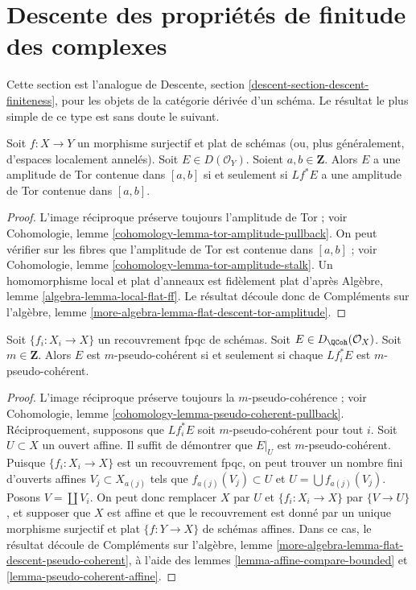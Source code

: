 \section{Descente des propriétés de finitude des complexes}
\label{section-descent-finiteness}

\noindent
Cette section est l'analogue de
Descente, section \ref{descent-section-descent-finiteness},
pour les objets de la catégorie dérivée d'un schéma.
Le résultat le plus simple de ce type est sans doute le suivant.

\begin{lemma}
\label{lemma-tor-amplitude-descends}
Soit $f : X \to Y$ un morphisme surjectif et plat de schémas
(ou, plus généralement, d'espaces localement annelés).
Soit $E \in D(\mathcal{O}_Y)$. Soient $a, b \in \mathbf{Z}$.
Alors $E$ a une amplitude de Tor contenue dans $[a, b]$ si et seulement si
$Lf^*E$ a une amplitude de Tor contenue dans $[a, b]$.
\end{lemma}

\begin{proof}
L'image réciproque préserve toujours l'amplitude de Tor ; voir
Cohomologie, lemme \ref{cohomology-lemma-tor-amplitude-pullback}.
On peut vérifier sur les fibres que l'amplitude de Tor est contenue dans $[a, b]$ ; voir
Cohomologie, lemme \ref{cohomology-lemma-tor-amplitude-stalk}.
Un homomorphisme local et plat d'anneaux est fidèlement plat d'après
Algèbre, lemme \ref{algebra-lemma-local-flat-ff}.
Le résultat découle donc de
Compléments sur l'algèbre, lemme
\ref{more-algebra-lemma-flat-descent-tor-amplitude}.
\end{proof}

\begin{lemma}
\label{lemma-pseudo-coherent-descends-fpqc}
Soit $\{f_i : X_i \to X\}$ un recouvrement fpqc de schémas. Soit
$E \in D_\QCoh(\mathcal{O}_X)$. Soit $m \in \mathbf{Z}$.
Alors $E$ est $m$-pseudo-cohérent si et seulement si chaque
$Lf_i^*E$ est $m$-pseudo-cohérent.
\end{lemma}

\begin{proof}
L'image réciproque préserve toujours la $m$-pseudo-cohérence ; voir
Cohomologie, lemme \ref{cohomology-lemma-pseudo-coherent-pullback}.
Réciproquement, supposons que $Lf_i^*E$ soit $m$-pseudo-cohérent pour tout $i$.
Soit $U \subset X$ un ouvert affine. Il suffit de démontrer que
$E|_U$ est $m$-pseudo-cohérent. Puisque $\{f_i : X_i \to X\}$ est un
recouvrement fpqc, on peut trouver un nombre fini d'ouverts affines $V_j \subset X_{a(j)}$
tels que $f_{a(j)}(V_j) \subset U$ et $U = \bigcup f_{a(j)}(V_j)$.
Posons $V = \coprod V_i$.
On peut donc remplacer $X$ par $U$ et $\{f_i : X_i \to X\}$ par
$\{V \to U\}$, et supposer que $X$ est affine et que le recouvrement
est donné par un unique morphisme surjectif et plat $\{f : Y \to X\}$
de schémas affines. Dans ce cas, le résultat découle de
Compléments sur l'algèbre, lemme \ref{more-algebra-lemma-flat-descent-pseudo-coherent},
à l'aide des lemmes \ref{lemma-affine-compare-bounded} et
\ref{lemma-pseudo-coherent-affine}.
\end{proof}

